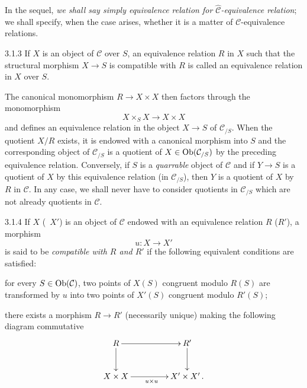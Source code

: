In the sequel, \emph{we shall say simply equivalence relation for
\(\widehat{\mathcal{C}}\)-equivalence relation}; we shall specify, when the
case arises, whether it is a matter of \(\mathcal{C}\)-equivalence
relations.%
{\renewcommand{\thefootnote}{(12)}}

\begin{definition}{3.1.3}
\label{IV.3.1.3}
If \(X\) is an object of \(\mathcal{C}\) over \(S\), an equivalence relation
\(R\) in \(X\) such that the structural morphism \(X\to S\) is compatible
with \(R\) is called an equivalence relation in \(X\) over \(S\).
\end{definition}

The canonical monomorphism \(R\to X\times X\) then factors through the
monomorphism
\[
X\times_{S}X\longrightarrow X\times X
\]
and defines an equivalence relation in the object \(X\to S\) of
\(\mathcal{C}_{/S}\). When the quotient \(X/R\) exists, it is endowed with
a canonical morphism into \(S\) and the corresponding object of
\(\mathcal{C}_{/S}\) is a quotient of \(X\in\operatorname{Ob}(\mathcal{C}_{/S})\) by the
preceding equivalence relation. Conversely, if \(S\) is a \emph{quarrable}
object of \(\mathcal{C}\) and if \(Y\to S\) is a quotient of \(X\) by this
equivalence relation (in \(\mathcal{C}_{/S}\)), then \(Y\) is a quotient of
\(X\) by \(R\) in \(\mathcal{C}\). In any case, we shall never have to
consider quotients in \(\mathcal{C}_{/S}\) which are not already quotients
in \(\mathcal{C}\).

\begin{definition}{3.1.4}
\label{IV.3.1.4}
If \(X\) (\resp\ \(X'\)) is an object of \(\mathcal{C}\) endowed with an
equivalence relation \(R\) (\resp \(R'\)), a morphism
\[
u\colon X\to X'
\]
is said to be \emph{compatible with \(R\) and \(R'\)} if the following
equivalent conditions are satisfied:
\begin{enumeratei}
\item for every \(S\in\operatorname{Ob}(\mathcal{C})\), two points of \(X(S)\) congruent
modulo \(R(S)\) are transformed by \(u\) into two points of \(X'(S)\)
congruent modulo \(R'(S)\);
\item there exists a morphism \(R\to R'\) (necessarily unique) making the
following diagram commutative
\[
\xymatrix@C=4.5em@R=2.6em{
R \ar[r] \ar[d]
  & R' \ar[d] \\
X\times X \ar[r]_{u\times u}
  & X'\times X'\,.
}
\]
\end{enumeratei}
\end{definition}

